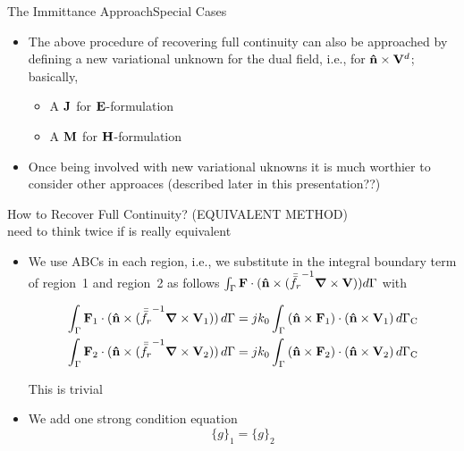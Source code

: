 \begin{frame}[allowframebreaks]{The Immittance Approach}{Special Cases}
  \begin{itemize}
  \item The above procedure of recovering full continuity can also be
    approached by defining a new variational unknown for the dual
    field, i.e., for $\mathbf{\hat{n}}\times\mathbf{V}^d$; basically,
    \begin{itemize}
    \item A $\mathbf{J}$ for $\mathbf{E}$-formulation
    \item A $\mathbf{M}$ for $\mathbf{H}$-formulation
    \end{itemize}
    
  \item Once being involved with new variational uknowns it is much
    worthier to consider other approaces (\alert{described later in
      this presentation??})
    
  \end{itemize}
      
  \framebreak  %

  \begin{center}
    How to Recover Full Continuity? (EQUIVALENT METHOD) \\ \alert{need
      to think twice if is really equivalent}
  \end{center}

  \begin{itemize}
  \item We use ABCs in each region, i.e., we substitute in the integral
    boundary term of region~1 and region~2 as follows
    $\int_{\Gamma} \mathbf{F}\cdot(\mathbf{\hat{n}} \times ( {\bar{\bar{f_r}}}^{-1}
    \boldsymbol{\nabla} \times \mathbf{V} )) d\Gamma$ with

    \begin{equation*}
      \begin{split}
        \int_{\Gamma} \mathbf{F}_1\cdot(\mathbf{\hat{n}} \times ( {\bar{\bar{f_r}}}^{-1} \boldsymbol{\nabla} \times \mathbf{V}_1 )) \,d\Gamma
        &= 
        jk_0 \int_{\Gamma} \left( \mathbf{\hat{n}} \times \mathbf{F}_1 \right) \cdot \left( \mathbf{\hat{n}} \times \mathbf{V}_1 \right) d\Gamma_\text{C}
        \\
        \int_{\Gamma} \mathbf{F}_2\cdot(\mathbf{\hat{n}} \times ( {\bar{\bar{f_r}}}^{-1} \boldsymbol{\nabla} \times \mathbf{V}_2 )) \,d\Gamma
        &= 
        jk_0 \int_{\Gamma} \left( \mathbf{\hat{n}} \times \mathbf{F}_2 \right) \cdot \left( \mathbf{\hat{n}} \times \mathbf{V}_2 \right) d\Gamma_\text{C}
      \end{split}
    \end{equation*}

    This is trivial

    \item We add one strong condition equation
      \begin{equation*}
         \lbrace g\rbrace_1 =  \lbrace g\rbrace_2 
      \end{equation*}
    \end{itemize}
      
    
\end{frame}

